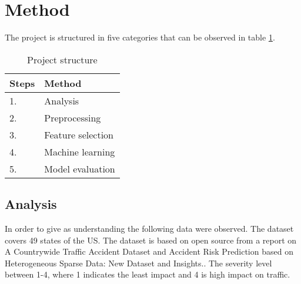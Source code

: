 \documentclass[../main.tex]{subfiles}
\begin{document}
\section{Method}
The project is structured in five categories that can be observed in table \ref{tab:project_struct}. 
\begin{table}[H]
\centering
\begin{tabular}{ll}
\hline
\textbf{Steps} & \textbf{Method}   \\ \hline
1.             & Analysis          \\ \hline
2.             & Preprocessing     \\ \hline
3.             & Feature selection \\ \hline
4.             & Machine learning  \\ \hline
5.             & Model evaluation  \\ \hline
\end{tabular}
\caption{Project structure}
\label{tab:project_struct}
\end{table}

\subsection{Analysis}
In order to give as understanding the following data were observed. The dataset covers 49 states of the US. The dataset is based on open source from a report on A Countrywide Traffic Accident Dataset\cite{moosavi2019countrywide} and Accident Risk Prediction based on Heterogeneous Sparse Data:  New Dataset  and  Insights.\cite{moosavi2019accident}. The severity level between 1-4, where 1 indicates the least impact and 4 is high impact on traffic.
\end{document}
